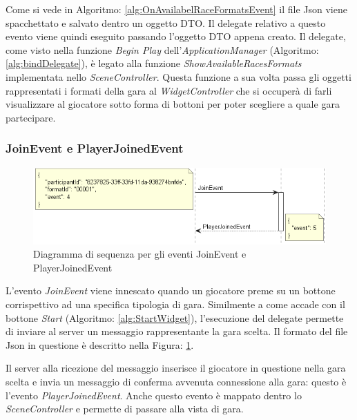         Come si vede in Algoritmo: \ref{alg:OnAvailabelRaceFormatsEvent} il file Json viene spacchettato e salvato dentro un oggetto DTO.
        Il delegate relativo a questo evento viene quindi eseguito passando l'oggetto DTO appena creato.
        Il delegate, come visto nella funzione \textit{Begin Play} dell'\textit{ApplicationManager} (Algoritmo: \ref{alg:bindDelegate}), è legato alla funzione \textit{ShowAvailableRacesFormats} implementata nello \textit{SceneController}.
        Questa funzione a sua volta passa gli oggetti rappresentati i formati della gara al \textit{WidgetController} che si occuperà di farli visualizzare al giocatore sotto forma di bottoni per poter scegliere a quale gara partecipare.

        \subsubsection{JoinEvent e PlayerJoinedEvent}

        \begin{figure}[b]\label{img:JoinEvent}
            \centering
            \includegraphics[width=13cm]{figure/JoinEvent.png}
            \caption{Diagramma di sequenza per gli eventi JoinEvent e PlayerJoinedEvent}
        \end{figure}

        L'evento \textit{JoinEvent} viene innescato quando un giocatore preme su un bottone corrispettivo ad una specifica tipologia di gara.
        Similmente a come accade con il bottone \textit{Start} (Algoritmo: \ref{alg:StartWidget}), l'esecuzione del delegate permette di inviare al server un messaggio rappresentante la gara scelta.
        Il formato del file Json in questione è descritto nella Figura: \ref{img:JoinEvent}.
        

        Il server alla ricezione del messaggio inserisce il giocatore in questione nella gara scelta e invia un messaggio di conferma avvenuta connessione alla gara: questo è l'evento \textit{PlayerJoinedEvent}.
        Anche questo evento è mappato dentro lo \textit{SceneController} e permette di passare alla vista di gara.

